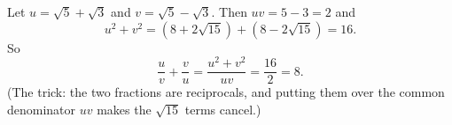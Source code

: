 Let $u=\sqrt5+\sqrt3$ and $v=\sqrt5-\sqrt3$. Then $uv=5-3=2$ and
\[
u^2+v^2=\left(8+2\sqrt{15}\right)+\left(8-2\sqrt{15}\right)=16 .
\]
So
\[
\dfrac {u}{v}+\dfrac {v}{u}=\dfrac{u^2+v^2}{uv}=\dfrac{16}{2}=\boxed{8}.
\]
(The trick: the two fractions are reciprocals, and putting them over the common denominator $uv$ makes the $\sqrt{15}$ terms cancel.)
